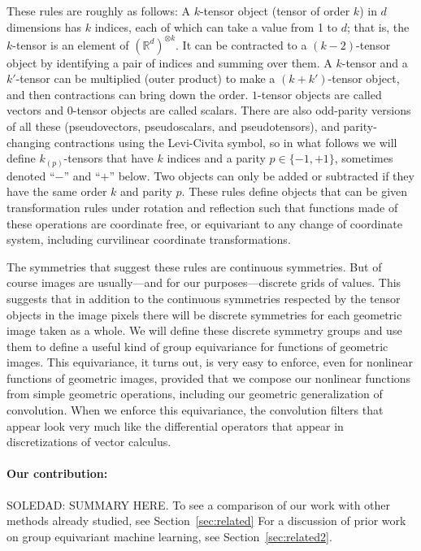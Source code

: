 \documentclass{article}
\theoremstyle{definition}
\newcommand{\tensorname}[2]{{#1}_{(#2)}}
\newcommand{\tensor}[2]{$\tensorname{#1}{#2}$-tensor}
\newcommand{\sectionname}{Section}
\begin{document}
These rules are roughly as follows:
A $k$-tensor object (tensor of order $k$) in $d$ dimensions has $k$ indices, each of which can take a value from 1 to $d$; that is, the $k$-tensor is an element of $(\mathbb R^d)^{\otimes k}$.
It can be contracted to a $(k-2)$-tensor object by identifying a pair of indices and summing over them.
A $k$-tensor and a $k'$-tensor can be multiplied (outer product) to make a $(k+k')$-tensor object, and then contractions can bring down the order.
$1$-tensor objects are called vectors and $0$-tensor objects are called scalars.
There are also odd-parity versions of all these (pseudovectors, pseudoscalars, and pseudotensors), and parity-changing contractions using the Levi-Civita symbol, so in what follows we will define \tensor{k}{p}s that have $k$ indices and a parity $p\in\{-1,+1\}$, sometimes denoted ``$-$'' and ``$+$'' below.
Two objects can only be added or subtracted if they have the same order $k$ and parity $p$.
These rules define objects that can be given transformation rules under rotation and reflection such that functions made of these operations are coordinate free, or equivariant to any change of coordinate system, including curvilinear coordinate transformations.

The symmetries that suggest these rules are continuous symmetries.
But of course images are usually---and for our purposes---discrete grids of values.
This suggests that in addition to the continuous symmetries respected by the tensor objects in the image pixels there will be discrete symmetries for each geometric image taken as a whole.
We will define these discrete symmetry groups and use them to define a useful kind of group equivariance for functions of geometric images.
This equivariance, it turns out, is very easy to enforce, even for nonlinear functions of geometric images, provided that we compose our nonlinear functions from simple geometric operations, including our geometric generalization of convolution.
When we enforce this equivariance, the convolution filters that appear look very much like the differential operators that appear in discretizations of vector calculus.

\paragraph{Our contribution:}
SOLEDAD: SUMMARY HERE. 
To see a comparison of our work with other methods already studied, see \sectionname~\ref{sec:related}
For a discussion of prior work on group equivariant machine learning, see \sectionname~\ref{sec:related2}.
\end{document}
